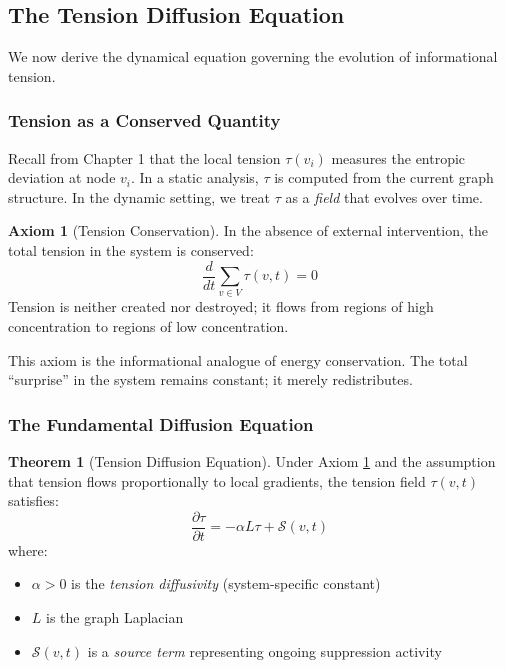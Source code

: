 \documentclass[12pt,a4paper]{article}
\theoremstyle{definition}
\newtheorem{axiom}{Axiom}
\newtheorem{theorem}{Theorem}[section]
\theoremstyle{remark}
\begin{document}
\subsection{The Tension Diffusion Equation}

We now derive the dynamical equation governing the evolution of informational tension.

\subsubsection{Tension as a Conserved Quantity}

Recall from Chapter 1 that the local tension $\tau(v_i)$ measures the entropic deviation at node $v_i$. In a static analysis, $\tau$ is computed from the current graph structure. In the dynamic setting, we treat $\tau$ as a \emph{field} that evolves over time.

\begin{axiom}[Tension Conservation]
\label{ax:tension-conservation}
In the absence of external intervention, the total tension in the system is conserved:
\begin{equation}
    \frac{d}{dt} \sum_{v \in V} \tau(v, t) = 0
\end{equation}
Tension is neither created nor destroyed; it flows from regions of high concentration to regions of low concentration.
\end{axiom}

This axiom is the informational analogue of energy conservation. The total ``surprise'' in the system remains constant; it merely redistributes.

\subsubsection{The Fundamental Diffusion Equation}

\begin{theorem}[Tension Diffusion Equation]
\label{thm:diffusion}
Under Axiom \ref{ax:tension-conservation} and the assumption that tension flows proportionally to local gradients, the tension field $\tau(v, t)$ satisfies:
\begin{equation}
    \boxed{
    \frac{\partial \tau}{\partial t} = -\alpha L \tau + \mathcal{S}(v, t)
    }
    \label{eq:diffusion}
\end{equation}
where:
\begin{itemize}
    \item $\alpha > 0$ is the \emph{tension diffusivity} (system-specific constant)
    \item $L$ is the graph Laplacian
    \item $\mathcal{S}(v, t)$ is a \emph{source term} representing ongoing suppression activity
\end{itemize}
\end{theorem}
\end{document}
